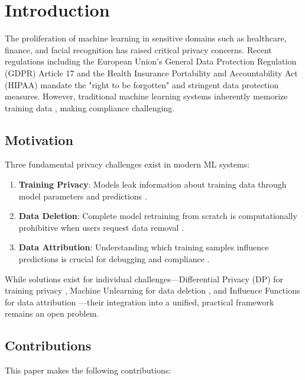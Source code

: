 \documentclass[conference]{IEEEtran}
\begin{document}
\section{Introduction}

The proliferation of machine learning in sensitive domains such as healthcare, finance, and facial recognition has raised critical privacy concerns. Recent regulations including the European Union's General Data Protection Regulation (GDPR) Article 17 \cite{gdpr2016} and the Health Insurance Portability and Accountability Act (HIPAA) \cite{hipaa1996} mandate the "right to be forgotten" and stringent data protection measures. However, traditional machine learning systems inherently memorize training data \cite{shokri2017membership}, making compliance challenging.

\subsection{Motivation}

Three fundamental privacy challenges exist in modern ML systems:

\begin{enumerate}
    \item \textbf{Training Privacy}: Models leak information about training data through model parameters and predictions \cite{fredrikson2015model}.
    \item \textbf{Data Deletion}: Complete model retraining from scratch is computationally prohibitive when users request data removal \cite{cao2015towards}.
    \item \textbf{Data Attribution}: Understanding which training samples influence predictions is crucial for debugging and compliance \cite{koh2017understanding}.
\end{enumerate}

While solutions exist for individual challenges—Differential Privacy (DP) for training privacy \cite{abadi2016deep}, Machine Unlearning for data deletion \cite{bourtoule2021machine}, and Influence Functions for data attribution \cite{koh2017understanding}—their integration into a unified, practical framework remains an open problem.

\subsection{Contributions}

This paper makes the following contributions:
\end{document}
